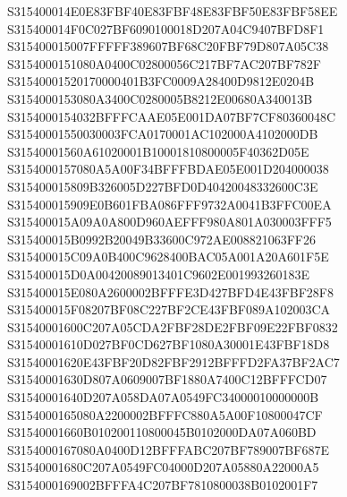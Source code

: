 \documentclass[12pt,a4paper]{article}
\begin{document}
\begin{framed}
{S315400014E0E83FBF40E83FBF48E83FBF50E83FBF58EE\newline
S315400014F0C027BF6090100018D207A04C9407BFD8F1\newline
S315400015007FFFFF389607BF68C20FBF79D807A05C38\newline
S3154000151080A0400C02800056C217BF7AC207BF782F\newline
S31540001520170000401B3FC0009A28400D9812E0204B\newline
S3154000153080A3400C0280005B8212E00680A340013B\newline
S3154000154032BFFFCAAE05E001DA07BF7CF80360048C\newline
S31540001550030003FCA0170001AC102000A4102000DB\newline
S31540001560A61020001B10001810800005F40362D05E\newline
S3154000157080A5A00F34BFFFBDAE05E001D204000038\newline
S315400015809B326005D227BFD0D40420048332600C3E\newline
S315400015909E0B601FBA086FFF9732A0041B3FFC00EA\newline
S315400015A09A0A800D960AEFFF980A801A030003FFF5\newline
S315400015B0992B20049B33600C972AE008821063FF26\newline
S315400015C09A0B400C9628400BAC05A001A20A601F5E\newline
S315400015D0A00420089013401C9602E001993260183E\newline
S315400015E080A2600002BFFFE3D427BFD4E43FBF28F8\newline
S315400015F08207BF08C227BF2CE43FBF089A102003CA\newline
S31540001600C207A05CDA2FBF28DE2FBF09E22FBF0832\newline
S31540001610D027BF0CD627BF1080A30001E43FBF18D8\newline
S31540001620E43FBF20D82FBF2912BFFFD2FA37BF2AC7\newline
S31540001630D807A0609007BF1880A7400C12BFFFCD07\newline
S31540001640D207A058DA07A0549FC34000010000000B\newline
S3154000165080A2200002BFFFC880A5A00F10800047CF\newline
S31540001660B010200110800045B0102000DA07A060BD\newline
S3154000167080A0400D12BFFFABC207BF789007BF687E\newline
S31540001680C207A0549FC04000D207A05880A22000A5\newline
S3154000169002BFFFA4C207BF7810800038B0102001F7\newline
}
\end{framed}
\end{document}
